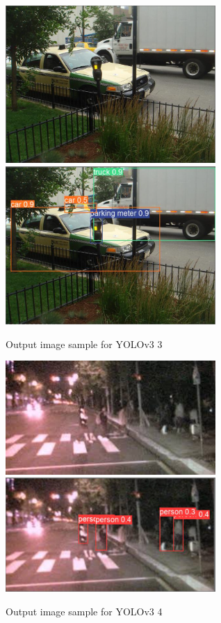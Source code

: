 \documentclass[runningheads,a4paper,11pt]{report}
\begin{document}
\begin{figure}
    \centering
\includegraphics[width=8cm]{images/image3.PNG}   
\includegraphics[width=8cm]{images/image3_label.PNG} \caption{Output image sample for YOLOv3 3}\label{fig:outyolo3}
\end{figure}
\begin{figure}
    \centering
\includegraphics[width=8cm]{images/image4.jpg}   
\includegraphics[width=8cm]{images/image4_label.PNG} \caption{Output image sample for YOLOv3 4}\label{fig:outyolo4}
\end{figure}
\end{document}
